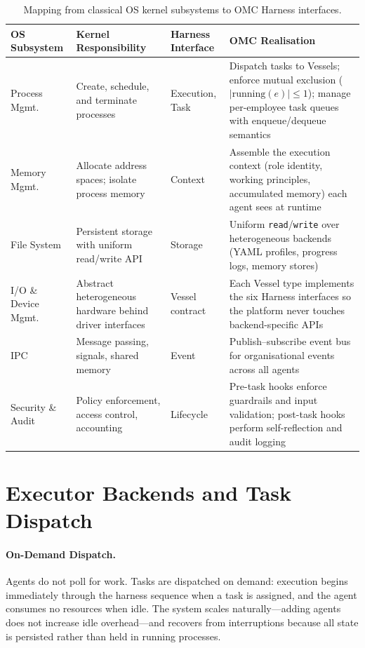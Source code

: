 \begin{table}[H]
\centering
\caption{Mapping from classical OS kernel subsystems to OMC Harness interfaces.}
\label{tab:os-correspondence}
\small
\setlength{\tabcolsep}{4pt}
\begin{tabularx}{\textwidth}{@{}>{\raggedright\arraybackslash}p{}>{\raggedright\arraybackslash}p{}>{\ttfamily\raggedright\arraybackslash}p{}X@{}}
\toprule
\textbf{OS Subsystem} & \textbf{Kernel Responsibility} & \textbf{Harness Interface} & \textbf{OMC Realisation} \\
\midrule
Process Mgmt. & Create, schedule, and terminate processes & Execution, Task & Dispatch tasks to Vessels; enforce mutual exclusion ($|\text{running}(e)| \leq 1$); manage per-employee task queues with enqueue/dequeue semantics \\
\addlinespace
Memory Mgmt. & Allocate address spaces; isolate process memory & Context & Assemble the execution context (role identity, working principles, accumulated memory) each agent sees at runtime \\
\addlinespace
File System & Persistent storage with uniform read/write API & Storage & Uniform \texttt{read}/\texttt{write} over heterogeneous backends (YAML profiles, progress logs, memory stores) \\
\addlinespace
I/O \& Device Mgmt. & Abstract heterogeneous hardware behind driver interfaces & Vessel contract & Each Vessel type implements the six Harness interfaces so the platform never touches backend-specific APIs \\
\addlinespace
IPC & Message passing, signals, shared memory & Event & Publish--subscribe event bus for organisational events across all agents \\
\addlinespace
Security \& Audit & Policy enforcement, access control, accounting & Lifecycle & Pre-task hooks enforce guardrails and input validation; post-task hooks perform self-reflection and audit logging \\
\bottomrule
\end{tabularx}
\end{table}


\section{Executor Backends and Task Dispatch}
\label{sec:execution}

\paragraph{On-Demand Dispatch.}
Agents do not poll for work. Tasks are dispatched on demand: execution begins immediately through the harness sequence when a task is assigned, and the agent consumes no resources when idle. The system scales naturally---adding agents does not increase idle overhead---and recovers from interruptions because all state is persisted rather than held in running processes.

